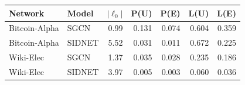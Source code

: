\begin{tabular}{@{}llrrrrr@{}}
\toprule
Network & Model & $|\ell_0|$ & P(U) & P(E) & L(U) & L(E) \\
\midrule
Bitcoin-Alpha & SGCN & 0.99 & 0.131 & 0.074 & 0.604 & 0.359 \\
Bitcoin-Alpha & SIDNET & 5.52 & 0.031 & 0.011 & 0.672 & 0.225 \\
Wiki-Elec & SGCN & 1.37 & 0.035 & 0.028 & 0.235 & 0.186 \\
Wiki-Elec & SIDNET & 3.97 & 0.005 & 0.003 & 0.060 & 0.036 \\
\bottomrule
\end{tabular}
